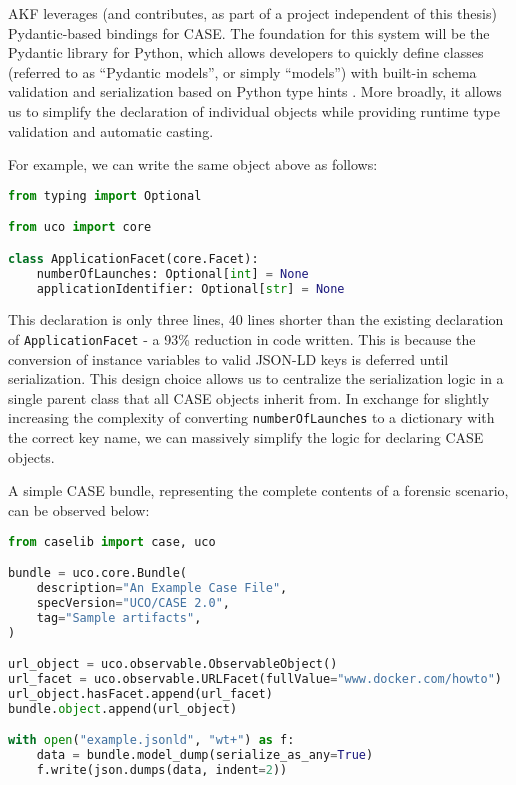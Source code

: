\documentclass[letterpaper,12pt]{report}
\newcommand{\passthrough}[1]{#1}
\begin{document}
AKF leverages (and contributes, as part of a project independent of this
thesis) Pydantic-based bindings for CASE. The foundation for this system
will be the Pydantic library for Python, which allows developers to
quickly define classes (referred to as ``Pydantic models'', or simply
``models'') with built-in schema validation and serialization based on
Python type hints \cite{colvinPydantic2024}. More broadly, it allows
us to simplify the declaration of individual objects while providing
runtime type validation and automatic casting.

For example, we can write the same object above as follows:

\begin{lstlisting}[language=Python]
from typing import Optional

from uco import core

class ApplicationFacet(core.Facet):
    numberOfLaunches: Optional[int] = None
    applicationIdentifier: Optional[str] = None
\end{lstlisting}

This declaration is only three lines, 40 lines shorter than the existing
declaration of \passthrough{\lstinline!ApplicationFacet!} - a 93\%
reduction in code written. This is because the conversion of instance
variables to valid JSON-LD keys is deferred until serialization. This
design choice allows us to centralize the serialization logic in a
single parent class that all CASE objects inherit from. In exchange for
slightly increasing the complexity of converting
\passthrough{\lstinline!numberOfLaunches!} to a dictionary with the
correct key name, we can massively simplify the logic for declaring CASE
objects.

A simple CASE bundle, representing the complete contents of a forensic
scenario, can be observed below:

\begin{lstlisting}[language=Python]
from caselib import case, uco

bundle = uco.core.Bundle(
    description="An Example Case File",
    specVersion="UCO/CASE 2.0",
    tag="Sample artifacts",
)

url_object = uco.observable.ObservableObject()
url_facet = uco.observable.URLFacet(fullValue="www.docker.com/howto")
url_object.hasFacet.append(url_facet)
bundle.object.append(url_object)

with open("example.jsonld", "wt+") as f:
    data = bundle.model_dump(serialize_as_any=True)
    f.write(json.dumps(data, indent=2))
\end{lstlisting}
\end{document}
